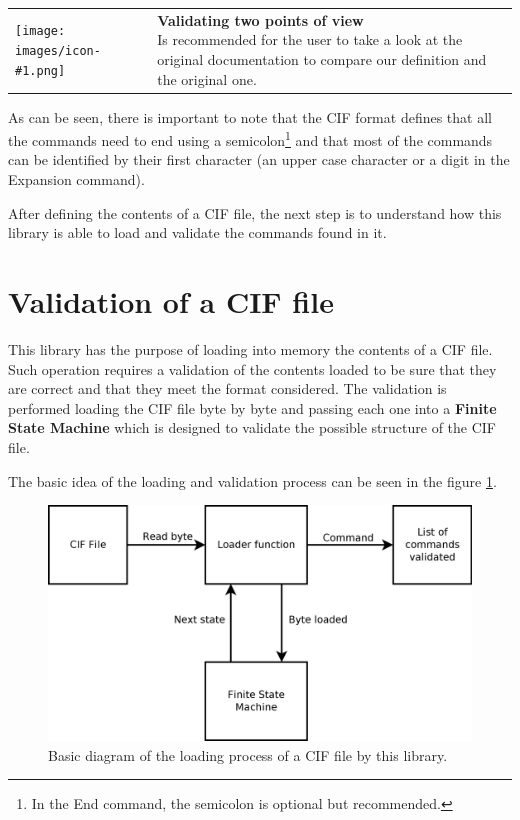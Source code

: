 \documentclass[11pt,twoside,openany,x11names,svgnames]{memoir}
\makeatletter
\newcommand{\IconNote}[3]
{
	\begin{table}[ht]
	\begin{tabular}{ lm{\dimexpr\textwidth-8\tabcolsep-\wd0}@{}}
		\toprule
		\texttt{[image: images/icon-\#1.png]}
		&
		\parbox[t]{155mm}{
		\textbf{#2} \\
		#3
		}
	\end{tabular}
\end{table}
}
\makeatother
\begin{document}
\IconNote
	{info}
	{Validating two points of view}
	{Is recommended for the user to take a look at the original documentation to compare our definition and the original one.}

As can be seen, there is important to note that the CIF format defines that all the commands need to end using a semicolon\footnote{In the End command, the semicolon is optional but recommended.} and that most of the commands can be identified by their first character (an upper case character or a digit in the Expansion command).

After defining the contents of a CIF file, the next step is to understand how this library is able to load and validate the commands found in it.

\section{Validation of a CIF file}\label{Validation-of-a-cif-file}

This library has the purpose of loading into memory the contents of a CIF file. Such operation requires a validation of the contents loaded to be sure that they are correct and that they meet the format considered. The validation is performed loading the CIF file byte by byte and passing each one into a \textbf{Finite State Machine} which is designed to validate the possible structure of the CIF file.

The basic idea of the loading and validation process can be seen in the figure \ref{fig:basicloading}.

\begin{figure}
	\centering
	\includegraphics[scale=0.2, clip=true, trim= 0pt 0pt 0pt 0pt]{images/chapter03-image07}
	\caption{Basic diagram of the loading process of a CIF file by this library.}
	\label{fig:basicloading}
\end{figure}
\end{document}

